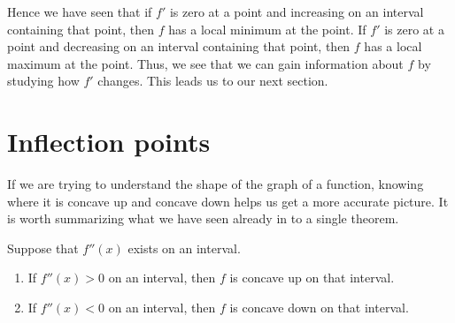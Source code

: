 \documentclass{ximera}
\begin{document}
\begin{example}
\begin{explanation}
\begin{image}
\end{image}
\end{explanation}
\end{example}


Hence we have seen that if $f'$ is zero at a point and increasing on an interval containing that  point,
then $f$ has a local minimum at the point. If $f'$ is zero at a point and
decreasing on an interval containing that point, then $f$ has a local maximum at the
point. Thus, we see that we can gain information about $f$ by
studying how $f'$ changes. This leads us to our next section.








\section{Inflection points}


If we are trying to understand the shape of the graph of a function,
knowing where it is concave up and concave down helps us  get a more
accurate picture. It is worth summarizing what we have seen already in
to a single theorem.

\begin{theorem}
Suppose that $f''(x)$ exists on an interval.
\begin{enumerate}
\item If $f''(x)>0$ on an interval, then $f$ is concave up on that interval.
\item If $f''(x)<0$ on an interval, then $f$ is concave down on that interval.
\end{enumerate}
\end{theorem}
\end{document}
